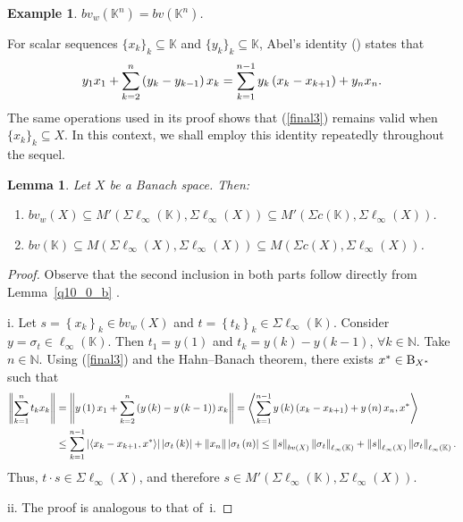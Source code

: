 \documentclass[14pt, a4paper]{article}  %
\providecommand{\llave}[1]{\left\lbrace #1\right\rbrace }
\providecommand{\pare}[1]{\left( #1\right) }
\providecommand{\norm}[1]{\left\lVert#1\right\rVert}
\providecommand{\abs}[1]{\left\lvert#1\right\rvert}
\providecommand{\Sum}[1]{\displaystyle\sum#1}
\newcommand{\K}{\mathbb{K}}
\newcommand{\N}{\mathbb{N}}
\newcommand{\B}{\textup{B}}
\newcommand{\la}{\left\langle}
\newcommand{\ra}{\right\rangle}
\newtheorem{lemma}{Lemma}[section]
\newtheorem{example}{Example}[section]  %
\begin{document}
\begin{example}
	$bv_w(\K^{n})=bv(\K^{n})$.
\end{example}


For scalar sequences $\{x_k\}_{k}\subseteq \K$ and $\{y_k\}_{k}\subseteq \K$, Abel's identity (\cite[(1.2.9)]{Wil}) states that
\begin{equation}\label{final3}
	y_{1}x_{1}+\Sum_{k=2}^{n}\pare{y_{k}-y_{k-1}}x_{k}
	=
	\Sum_{k=1}^{n-1}y_{k}\pare{x_{k}-x_{k+1}} + y_{n}x_{n}.
\end{equation}
The same operations used in its proof shows that (\ref{final3}) remains valid when $\{x_k\}_{k}\subseteq X$. In this context, we shall employ this identity repeatedly throughout the sequel.

 

 

\begin{lemma} 
Let $X$ be a Banach space. Then: \begin{enumerate} \item[i.] $bv_w\pare{X}\subseteq M'\pare{\Sigma \ell_{\infty}\pare{\K},\Sigma \ell_{\infty}\pare{X}}\subseteq M'\pare{\Sigma c\pare{\K},\Sigma \ell_{\infty}\pare{X}}$. \item[ii.] $bv\pare{\K}\subseteq M\pare{\Sigma \ell_{\infty}\pare{X},\Sigma \ell_{\infty}\pare{X}}\subseteq M\pare{\Sigma c\pare{X},\Sigma \ell_{\infty}\pare{X}}$. \end{enumerate} \end{lemma}

\begin{proof}
	Observe that the second inclusion  in both parts follow directly from Lemma~\ref{q10_0_b} .
	
	i. Let $s=\llave{x_{k}}_{k}\in bv_w\pare{X}$ and $t=\llave{t_{k}}_{k}\in \Sigma \ell_{\infty}\pare{\K}$. Consider $y=\sigma_{t}\in\ell_{\infty}\pare{\K}$. Then $t_{1}=y\pare{1}$ and $t_{k}=y\pare{k}-y\pare{k-1}$, $\forall k\in \N$. Take $n \in \N$. Using (\ref{final3}) and the Hahn--Banach theorem, there exists $x^{*}\in \B_{X^{*}}$ such that
	\begin{align*}
		\norm{\Sum_{k=1}^{n}t_{k}x_{k}}
		&=
		\norm{y\pare{1}x_{1}+\Sum_{k=2}^{n}\pare{y\pare{k}-y\pare{k-1}}x_{k}}
		=
		\la
		\Sum_{k=1}^{n-1} y\pare{k}\pare{x_{k}-x_{k+1}}
		+y\pare{n}x_{n},
		x^{*}
		\ra
		\nonumber\\
		&\leq
		\Sum_{k=1}^{n-1}
		\abs{\la x_{k}-x_{k+1},x^{*}\ra}
		\abs{\sigma_{t}\pare{k}}
		+
		\norm{x_{n}}
		\abs{\sigma_{t}\pare{n}}
		\leq
		\norm{s}_{bv\pare{X}}\norm{\sigma_{t}}_{\ell_{\infty}\pare{\K}}
		+
		\norm{s}_{\ell_{\infty}\pare{X}}
		\norm{\sigma_{t}}_{\ell_{\infty}\pare{\K}}.
	\end{align*}
	Thus, $t\cdot s\in\Sigma \ell_{\infty}\pare{X}$, and therefore $s\in M'\pare{\Sigma \ell_{\infty}\pare{\K},\Sigma \ell_{\infty}\pare{X}}$.
	
	ii. The proof is analogous to that of~i.
\end{proof}
\end{document}
